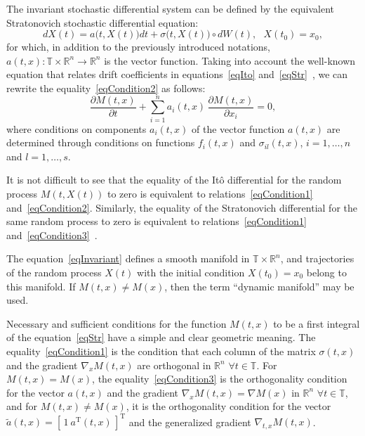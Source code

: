 \documentclass[10pt,reqno]{amsart}
\newcommand{\trans}{{\scriptscriptstyle \mathrm{T}}}
\theoremstyle{plain}
\theoremstyle{remark}
\begin{document}
The invariant stochastic differential system can be defined by the equivalent Stratonovich stochastic differential equation:
\begin{equation}\label{eqStr}
  dX(t) = a \bigl( t,X(t) \bigr) dt + \sigma \bigl( t,X(t) \bigr) \circ dW(t), \ \ \ X(t_0) = x_0,
\end{equation}
for which, in addition to the previously introduced notations, $a(t,x) \colon \mathds{T} \times \mathds{R}^n \to \mathds{R}^n$ is the vector function. Taking into account the well-known equation that relates drift coefficients in equations~\eqref{eqIto} and~\eqref{eqStr}~\cite{KloPla_92}, we can rewrite the equality~\eqref{eqCondition2} as follows:
\begin{equation}\label{eqCondition3}
  \frac{\partial M(t,x)}{\partial t} + \sum\limits_{i=1}^n a_i(t,x) \, \frac{\partial M(t,x)}{\partial x_i} = 0,
\end{equation}
where conditions on components $a_i(t,x)$ of the vector function $a(t,x)$ are determined through conditions on functions $f_i(t,x)$ and $\sigma_{il}(t,x)$, $i = 1,\dots,n$ and $l = 1,\dots,s$.

It is not difficult to see that the equality of the It\^o differential for the random process $M(t,X(t))$ to zero is equivalent to relations~\eqref{eqCondition1} and~\eqref{eqCondition2}. Similarly, the equality of the Stratonovich differential for the same random process to zero is equivalent to relations~\eqref{eqCondition1} and~\eqref{eqCondition3}~\cite{Dub_12, Kar_14}.

The equation~\eqref{eqInvariant} defines a smooth manifold in $\mathds{T} \times \mathds{R}^n$, and trajectories of the random process $X(t)$ with the initial condition $X(t_0) = x_0$ belong to this manifold. If $M(t,x) \neq M(x)$, then the term ``dynamic manifold'' may be used.

Necessary and sufficient conditions for the function $M(t,x)$ to be a first integral of the equation~\eqref{eqStr} have a simple and clear geometric meaning. The equality~\eqref{eqCondition1} is the condition that each column of the matrix $\sigma(t,x)$ and the gradient $\nabla_x M(t,x)$ are orthogonal in $\mathds{R}^n$ $\forall t \in \mathds{T}$. For $M(t,x) = M(x)$, the equality~\eqref{eqCondition3} is the orthogonality condition for the vector $a(t,x)$ and the gradient $\nabla_x M(t,x) = \nabla M(x)$ in $\mathds{R}^n$ $\forall t \in \mathds{T}$, and for $M(t,x) \neq M(x)$, it is the orthogonality condition for the vector $\tilde a(t,x) = [ \, 1 ~ a^\trans(t,x) \, ]^\trans$ and the generalized gradient $\nabla_{t,x} M(t,x)$.
\end{document}
